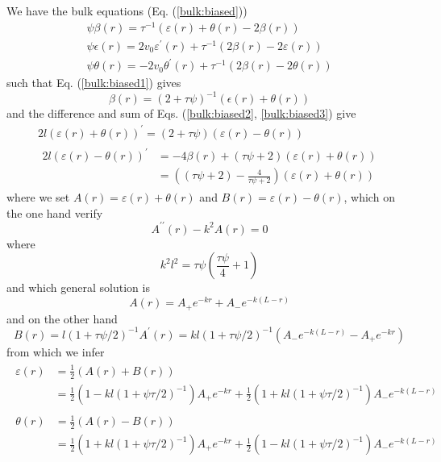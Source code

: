\documentclass[pre,aps,superscriptaddress,nofootinbib]{revtex4}
\begin{document}
We have the bulk equations (Eq. (\ref{bulk:biased}))
\begin{eqnarray}
\label{bulk:biased1}
\psi \beta(r) = \tau^{-1} (\varepsilon(r) + \theta(r) - 2 \beta(r))\\
\label{bulk:biased2}
\psi \epsilon(r) = 2 v_0 \varepsilon^{\prime}(r) + \tau^{-1} (2 \beta(r) - 2 \varepsilon(r))\\
\label{bulk:biased3}
\psi \theta(r) = -2 v_0 \theta^{\prime}(r) + \tau^{-1} (2 \beta(r) - 2 \theta(r))
\end{eqnarray}
such that Eq. (\ref{bulk:biased1}) gives
\begin{equation}
\beta(r) = (2 + \tau\psi)^{-1} (\epsilon(r) + \theta(r))
\end{equation}
and the difference and sum of Eqs. (\ref{bulk:biased2}, \ref{bulk:biased3}) give
\begin{eqnarray}
2 l (\varepsilon(r) + \theta(r))^{\prime} = (2 + \tau \psi)(\varepsilon(r) - \theta(r))\\
\begin{aligned}
2 l (\varepsilon(r) - \theta(r))^{\prime} &= -4 \beta(r) + (\tau\psi + 2)(\varepsilon(r) + \theta(r))\\
&= \left((\tau\psi + 2) - \frac{4}{\tau\psi + 2}\right)(\varepsilon(r) + \theta(r))
\end{aligned}
\end{eqnarray}
where we set $A(r) = \varepsilon(r) + \theta(r)$ and $B(r) = \varepsilon(r) - \theta(r)$, which on the one hand verify
\begin{equation}
A^{\prime\prime}(r) - k^2 A(r) = 0
\end{equation}
where
\begin{equation}
k^2 l^2 = \tau \psi \left(\frac{\tau \psi}{4} + 1\right)
\label{kPsi}
\end{equation}
and which general solution is
\begin{equation}
A(r) = A_+ e^{- k r} + A_- e^{-k (L - r)}
\end{equation}
and on the other hand
\begin{equation}
B(r) = l(1 + \tau \psi/2)^{-1} A^{\prime}(r) = kl (1 + \tau\psi/2)^{-1} (A_- e^{-k(L - r)} - A_+ e^{-k r})
\end{equation}
from which we infer
\begin{eqnarray}
\label{epsilon}
\begin{aligned}
\varepsilon(r) &= \frac{1}{2} (A(r) + B(r))\\
&= \frac{1}{2}\left(1 - k l (1 + \psi \tau/2)^{-1}\right) A_+ e^{- k r} + \frac{1}{2}\left(1 + k l (1 + \psi \tau/2)^{-1}\right) A_- e^{- k (L - r)}
\end{aligned}
\mbox{}\\
\label{theta}
\begin{aligned}
\theta(r) &= \frac{1}{2} (A(r) - B(r))\\
&= \frac{1}{2}\left(1 + k l (1 + \psi \tau/2)^{-1}\right) A_+ e^{- k r} + \frac{1}{2}\left(1 - k l (1 + \psi \tau/2)^{-1}\right) A_- e^{- k (L - r)}
\end{aligned}
\end{eqnarray}
\end{document}
